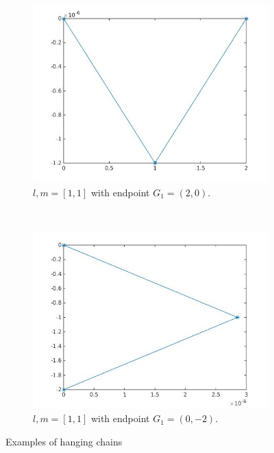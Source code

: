 \begin{figure}
        \begin{subfigure}[b]{0.45\textwidth}
                \includegraphics[width=\textwidth]{test3.jpg}
                \caption{$l,m = [1,1]$ with endpoint $G_1 = (2,0)$.}
                \label{fig:test3}
        \end{subfigure}
        ~
        \begin{subfigure}[b]{0.45\textwidth}
                \includegraphics[width=\textwidth]{test4.jpg}
                \caption{$l,m = [1,1]$ with endpoint $G_1 = (0,-2)$.}
                \label{fig:test4}
        \end{subfigure}
        \caption{Examples of hanging chains}\label{fig:exp}
\end{figure}
